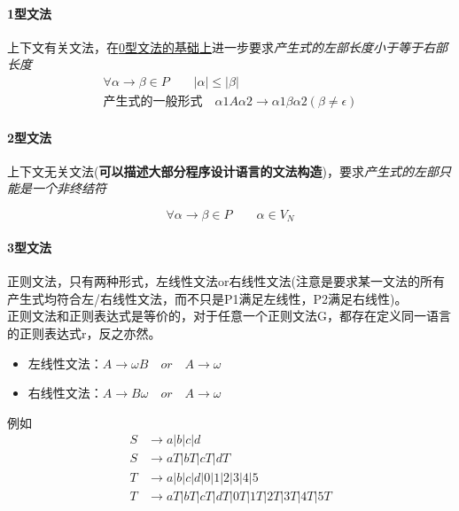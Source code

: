 \documentclass[UTF8]{ctexart} %
\begin{document}
\paragraph{1型文法} 上下文有关文法，在\underline{0型文法的基础上}进一步要求\emph{产生式的左部长度小于等于右部长度}
\begin{equation}
    \begin{aligned}
        \forall \alpha \rightarrow \beta \in P \qquad |\alpha| \leq |\beta| \\
        \text{产生式的一般形式}\quad \alpha1A\alpha2 \rightarrow \alpha1\beta\alpha2(\beta \neq \epsilon)
    \end{aligned}
\end{equation}

\paragraph{2型文法} 上下文无关文法(\textbf{可以描述大部分程序设计语言的文法构造})，要求\emph{产生式的左部只能是一个非终结符}

\begin{equation}
    \forall \alpha \rightarrow \beta \in P \qquad \alpha \in V_N
\end{equation}

\paragraph{3型文法} 正则文法，只有两种形式，左线性文法or右线性文法(注意是要求某一文法的所有产生式均符合左/右线性文法，而不只是P1满足左线性，P2满足右线性)。\\
正则文法和正则表达式是等价的，对于任意一个正则文法G，都存在定义同一语言的正则表达式r，反之亦然。

\begin{itemize}
    \item 左线性文法：$A\rightarrow \omega B \quad or \quad A\rightarrow \omega $
    \item 右线性文法：$A\rightarrow B \omega \quad or \quad A\rightarrow \omega $
\end{itemize}

例如
\begin{align*}
    S & \rightarrow a|b|c|d                       \\
    S & \rightarrow aT|bT|cT|dT                   \\
    T & \rightarrow a|b|c|d|0|1|2|3|4|5           \\
    T & \rightarrow aT|bT|cT|dT|0T|1T|2T|3T|4T|5T
\end{align*}
\end{document}
